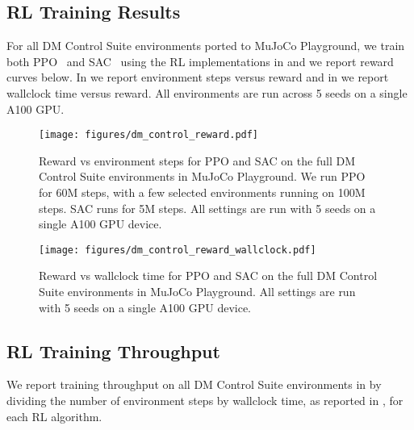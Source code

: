 \subsection{RL Training Results}
\label{sec:appendix_dm_control_curves}

For all DM Control Suite environments ported to MuJoCo Playground, we train both PPO~\cite{schulman2017proximal} and SAC~\cite{haarnoja2018soft} using the RL implementations in \cite{freeman2021brax} and we report reward curves below. In  we report environment steps versus reward and in  we report wallclock time versus reward. All environments are run across 5 seeds on a single A100 GPU.

\begin{figure}[ht]
    \centering
    \texttt{[image: figures/dm\_control\_reward.pdf]}
    \caption{\small Reward vs environment steps for PPO and SAC on the full DM Control Suite environments in MuJoCo Playground. We run PPO for 60M steps, with a few selected environments running on 100M steps. SAC runs for 5M steps. All settings are run with 5 seeds on a single A100 GPU device.}
    \label{fig:dm_control_step_reward}
\end{figure}

\begin{figure}[ht]
    \centering
    \texttt{[image: figures/dm\_control\_reward\_wallclock.pdf]}
    \caption{\small Reward vs wallclock time for PPO and SAC on the full DM Control Suite environments in MuJoCo Playground. All settings are run with 5 seeds on a single A100 GPU device.}
    \label{fig:dm_control_time_reward}
\end{figure}

\subsection{RL Training Throughput}
\label{sec:appendix_dm_control_training_throughput}

We report training throughput on all DM Control Suite environments in  by dividing the number of environment steps by wallclock time, as reported in , for each RL algorithm.

